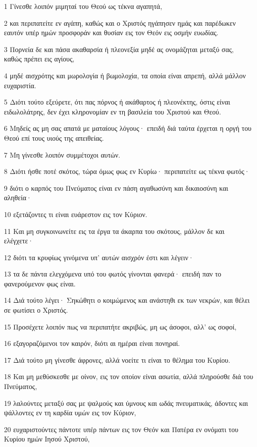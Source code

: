 \par 1 Γίνεσθε λοιπόν μιμηταί του Θεού ως τέκνα αγαπητά,
\par 2 και περιπατείτε εν αγάπη, καθώς και ο Χριστός ηγάπησεν ημάς και παρέδωκεν εαυτόν υπέρ ημών προσφοράν και θυσίαν εις τον Θεόν εις οσμήν ευωδίας.
\par 3 Πορνεία δε και πάσα ακαθαρσία ή πλεονεξία μηδέ ας ονομάζηται μεταξύ σας, καθώς πρέπει εις αγίους,
\par 4 μηδέ αισχρότης και μωρολογία ή βωμολοχία, τα οποία είναι απρεπή, αλλά μάλλον ευχαριστία.
\par 5 Διότι τούτο εξεύρετε, ότι πας πόρνος ή ακάθαρτος ή πλεονέκτης, όστις είναι ειδωλολάτρης, δεν έχει κληρονομίαν εν τη βασιλεία του Χριστού και Θεού.
\par 6 Μηδείς ας μη σας απατά με ματαίους λόγους· επειδή διά ταύτα έρχεται η οργή του Θεού επί τους υιούς της απειθείας.
\par 7 Μη γίνεσθε λοιπόν συμμέτοχοι αυτών.
\par 8 Διότι ήσθε ποτέ σκότος, τώρα όμως φως εν Κυρίω· περιπατείτε ως τέκνα φωτός·
\par 9 διότι ο καρπός του Πνεύματος είναι εν πάση αγαθωσύνη και δικαιοσύνη και αληθεία·
\par 10 εξετάζοντες τι είναι ευάρεστον εις τον Κύριον.
\par 11 Και μη συγκοινωνείτε εις τα έργα τα άκαρπα του σκότους, μάλλον δε και ελέγχετε·
\par 12 διότι τα κρυφίως γινόμενα υπ' αυτών αισχρόν έστι και λέγειν·
\par 13 τα δε πάντα ελεγχόμενα υπό του φωτός γίνονται φανερά· επειδή παν το φανερούμενον φως είναι.
\par 14 Διά τούτο λέγει· Σηκώθητι ο κοιμώμενος και ανάστηθι εκ των νεκρών, και θέλει σε φωτίσει ο Χριστός.
\par 15 Προσέχετε λοιπόν πως να περιπατήτε ακριβώς, μη ως άσοφοι, αλλ' ως σοφοί,
\par 16 εξαγοραζόμενοι τον καιρόν, διότι αι ημέραι είναι πονηραί.
\par 17 Διά τούτο μη γίνεσθε άφρονες, αλλά νοείτε τι είναι το θέλημα του Κυρίου.
\par 18 Και μη μεθύσκεσθε με οίνον, εις τον οποίον είναι ασωτία, αλλά πληρούσθε διά του Πνεύματος,
\par 19 λαλούντες μεταξύ σας με ψαλμούς και ύμνους και ωδάς πνευματικάς, άδοντες και ψάλλοντες εν τη καρδία υμών εις τον Κύριον,
\par 20 ευχαριστούντες πάντοτε υπέρ πάντων εις τον Θεόν και Πατέρα εν ονόματι του Κυρίου ημών Ιησού Χριστού,
